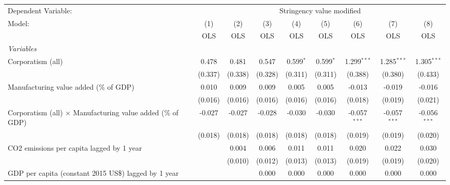 
\begingroup
\centering
\begin{tabular}{lcccccccc}
   \toprule
   Dependent Variable: & \multicolumn{8}{c}{Stringency value modified}\\
   Model:                                                             & (1)     & (2)     & (3)     & (4)         & (5)         & (6)            & (7)            & (8)\\  
                                                                      &  OLS    & OLS     & OLS     & OLS         & OLS         & OLS            & OLS            & OLS\\  
   \midrule
   \emph{Variables}\\
   Corporatism (all)                                                  & 0.478   & 0.481   & 0.547   & 0.599$^{*}$ & 0.599$^{*}$ & 1.299$^{***}$  & 1.285$^{***}$  & 1.305$^{***}$\\   
                                                                      & (0.337) & (0.338) & (0.328) & (0.311)     & (0.311)     & (0.388)        & (0.380)        & (0.433)\\   
   Manufacturing value added (\% of GDP)                              & 0.010   & 0.009   & 0.009   & 0.005       & 0.005       & -0.013         & -0.019         & -0.016\\   
                                                                      & (0.016) & (0.016) & (0.016) & (0.016)     & (0.016)     & (0.018)        & (0.019)        & (0.021)\\   
   Corporatism (all) $\times$ Manufacturing value added (\% of GDP)   & -0.027  & -0.027  & -0.028  & -0.030      & -0.030      & -0.057$^{***}$ & -0.057$^{***}$ & -0.056$^{***}$\\   
                                                                      & (0.018) & (0.018) & (0.018) & (0.018)     & (0.018)     & (0.019)        & (0.019)        & (0.020)\\   
   CO2 emissions per capita lagged by 1 year                          &         & 0.004   & 0.006   & 0.011       & 0.011       & 0.020          & 0.022          & 0.030\\   
                                                                      &         & (0.010) & (0.012) & (0.013)     & (0.013)     & (0.019)        & (0.019)        & (0.020)\\   
   GDP per capita (constant 2015 US\$) lagged by 1 year               &         &         & 0.000   & 0.000       & 0.000       & 0.000          & 0.000          & 0.000\\   

\end{tabular}
